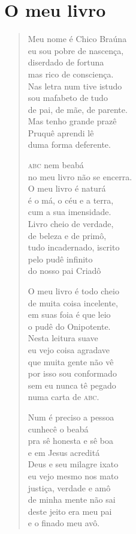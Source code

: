 \chapter{O meu livro}

\begin{verse}
Meu nome é Chico Braúna\\
eu sou pobre de nascença,\\
diserdado de fortuna\\
mas rico de consciença.\\
Nas letra num tive istudo\\
sou mafabeto de tudo\\
de pai, de mãe, de parente.\\
Mas tenho grande prazê\\
Pruquê aprendi lê\\
duma forma deferente.

\textsc{abc} nem beabá\\
no meu livro não se encerra.\\
O meu livro é naturá\\
é o má, o céu e a terra,\\
cum a sua imensidade.\\
Livro cheio de verdade,\\
de beleza e de primô,\\
tudo incadernado, iscrito\\
pelo pudê infinito\\
do nosso pai Criadô

O meu livro é todo cheio\\
de muita coisa incelente,\\
em suas foia é que leio\\
o pudê do Onipotente.\\
Nesta leitura suave\\
eu vejo coisa agradave\\
que muita gente não vê\\
por isso sou conformado\\
sem eu nunca tê pegado\\
numa carta de \textsc{abc}.

Num é preciso a pessoa\\
cunhecê o beabá\\
pra sê honesta e sê boa\\
e em Jesus acreditá\\
Deus e seu milagre ixato\\
eu vejo mesmo nos mato\\
justiça, verdade e amô\\
de minha mente não sai\\
deste jeito era meu pai\\
e o finado meu avô.


\end{verse}
